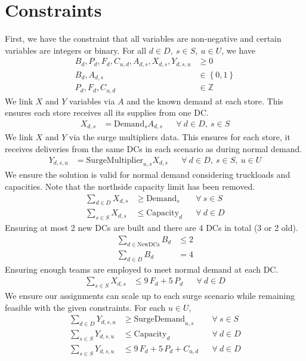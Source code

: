 \documentclass[11pt,a4paper]{article}
\begin{document}
\section{Constraints}
First, we have the constraint that all variables are non-negative and certain variables 
are integers or binary. For all $d \in D,~s \in S, ~u \in U$, we have
\begin{align*}
    B_d, P_d, F_d, C_{u,d}, A_{d,s}, X_{d,s}, Y_{d,s,u}  &\ge 0  \\ 
    B_d, A_{d,s} &\in  \left\{ 0, 1\right\} \\ 
    P_d, F_d, C_{u,d} &\in \mathbb Z
\end{align*}
We link $X$ and $Y$ variables via $A$ and the known demand at each store. This ensures 
each store receives all its supplies from one DC.
\begin{align*}
    X_{d,s} &= \mathrm{Demand}_s A_{d,s} && \forall~d \in D, ~s \in S
\end{align*}
We link $X$ and $Y$ via the surge multipliers data. This ensures for each store, 
it receives deliveries from the same DCs in each scenario as during normal demand. 
\begin{align*}
    Y_{d,s,u} &= \mathrm{SurgeMultiplier}_{u,s} X_{d,s} && \forall~d \in D,~s \in S,~u \in U
\end{align*}
We ensure the solution is valid for normal demand considering 
truckloads and capacities. Note that the northside capacity limit has been removed.
\begin{align*}
    \sum_{d \in D} X_{d,s} &\ge \mathrm{Demand}_{s} &&\forall~s \in S \\ 
    \sum_{s \in S} X_{d,s} &\le \mathrm{Capacity}_d &&\forall~d \in D 
\end{align*}
Ensuring at most 2 new DCs are built and there are 4 DCs in total (3 or 2 old).
\begin{align*}
    \sum_{d \in \mathrm{NewDCs}} B_d &\le 2 \\ 
    \sum_{d \in D} B_d &= 4 
\end{align*}
Ensuring enough teams are employed to meet normal demand at each DC.
\begin{align*}
    \sum_{s \in S} X_{d,s} &\le 9\,F_d + 5\,P_d && \forall~d \in D
\end{align*}
We ensure our assignments can scale up to each surge scenario while remaining 
feasible with the given constraints. 
For each $u \in U$,
\begin{align*}
    \sum_{d \in D} Y_{d,s,u} &\ge \mathrm{SurgeDemand}_{u,s} &&\forall~s \in S \\ 
    \sum_{s \in S} Y_{d,s,u} &\le \mathrm{Capacity}_d &&\forall~d \in D \\ 
    \sum_{s \in S} Y_{d,s,u} &\le 9\,F_d + 5\,P_d + C_{u,d} && \forall~d \in D
\end{align*}
\end{document}
